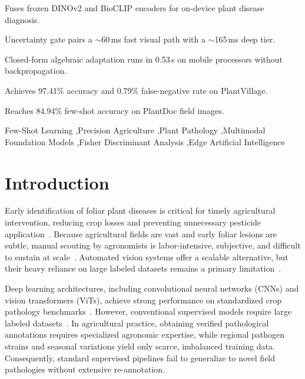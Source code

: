 \documentclass[preprint,12pt]{elsarticle}
\begin{document}
\begin{frontmatter}
\begin{highlights}
\item Fuses frozen DINOv2 and BioCLIP encoders for on-device plant disease diagnosis.
\item Uncertainty gate pairs a $\sim$60\,ms fast visual path with a $\sim$165\,ms deep tier.
\item Closed-form algebraic adaptation runs in 0.53\,s on mobile processors without backpropagation.
\item Achieves 97.41\% accuracy and 0.79\% false-negative rate on PlantVillage.
\item Reaches 84.94\% few-shot accuracy on PlantDoc field images.
\end{highlights}

\begin{keyword}
Few-Shot Learning \sep Precision Agriculture \sep Plant Pathology \sep Multimodal Foundation Models \sep Fisher Discriminant Analysis \sep Edge Artificial Intelligence
\end{keyword}

\end{frontmatter}

\section{Introduction}
\label{sec:intro}
Early identification of foliar plant diseases is critical for timely agricultural intervention, reducing crop losses and preventing unnecessary pesticide application~\cite{richard2022control}. Because agricultural fields are vast and early foliar lesions are subtle, manual scouting by agronomists is labor-intensive, subjective, and difficult to sustain at scale~\cite{shoaib2023advanced,radocaj2025evolution}. Automated vision systems offer a scalable alternative, but their heavy reliance on large labeled datasets remains a primary limitation~\cite{shoaib2023advanced}.

Deep learning architectures, including convolutional neural networks (CNNs) and vision transformers (ViTs), achieve strong performance on standardized crop pathology benchmarks~\cite{gupta2024fruit,dinesh2025plant}. However, conventional supervised models require large labeled datasets~\cite{shoaib2023advanced}. In agricultural practice, obtaining verified pathological annotations requires specialized agronomic expertise, while regional pathogen strains and seasonal variations yield only scarce, imbalanced training data. Consequently, standard supervised pipelines fail to generalize to novel field pathologies without extensive re-annotation.
\end{document}
